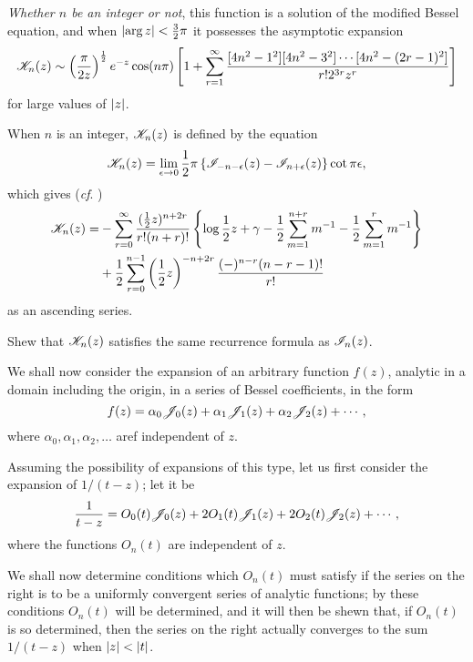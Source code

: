 % 
% 
\emph{Whether $n$ be an integer or not}, this function is a
solution of the modified Bessel equation, and when
$\left| \arg z \right| < \frac{3}{2} \pi$ it possesses the asymptotic
expansion
$$
\mathscr{K}_{n}(z)
\sim
\left(  \frac{\pi}{2z}  \right)^{\frac{1}{2}}
e^{-z}
\cos (n\pi)
\left[ 
  1
  +
  \sum_{r=1}^{\infty}
  \frac{ [4n^{2}-1^{2}] [4n^{2}-3^{2}] \cdots [4n^{2} - (2r-1)^{2}]}{r! 2^{3r} z^{r}}
 \right]
$$
for large values of $\left| z \right|$.

When $n$ is an integer, $\mathscr{K}_{n}(z)$ is defined by the equation
$$
\mathscr{K}_{n}(z)
=
\lim_{\epsilon\rightarrow 0}
\frac{1}{2} \pi
\left\{  \mathscr{I}_{-n-\epsilon}(z) - \mathscr{I}_{n+\epsilon}(z) \right\} \cot \pi\epsilon,
$$
which gives (\emph{cf}. )
\begin{align*}
  \mathscr{K}_{n}(z)
  =&
  -\sum_{r=0}^{\infty}
  \frac{(\frac{1}{2} z)^{n+2r}}{r! (n+r)!}
  \left\{ 
    \log \frac{1}{2} z + \gamma
    - \frac{1}{2} \sum_{m=1}^{n+r} m^{-1}
    - \frac{1}{2} \sum_{m=1}^{r} m^{-1}
   \right\}
  \\
  &
  + \frac{1}{2} \sum_{r=0}^{n-1}
  \left( \frac{1}{2} z \right)^{-n+2r}
  \frac{(-)^{n-r} (n-r-1)!}{r!}
\end{align*}
as an ascending series.
\begin{wandwexample}
  Shew that $\mathscr{K}_{n}(z)$ satisfies the same recurrence formula as
  $\mathscr{I}_{n}(z)$. 
\end{wandwexample}

We shall now consider the expansion of an arbitrary function
$f(z)$, analytic in a domain including the origin, in a series
of Bessel coefficients, in the form
$$
f(z) = \alpha_{0} \mathscr{J}_{0}(z) + \alpha_{1} \mathscr{J}_{1}(z) + \alpha_{2}
\mathscr{J}_{2}(z) + \cdots,
$$
where $\alpha_{0}, \alpha_{1}, \alpha_{2},\ldots$ aref independent of
$z$.

Assuming the possibility of expansions of this type, let us first
consider the expansion of $1/(t-z)$; let it be
$$
\frac{1}{t-z}
=
O_{0}(t) \mathscr{J}_{0}(z)
+ 2 O_{1}(t) \mathscr{J}_{1}(z)
+ 2 O_{2}(t) \mathscr{J}_{2}(z)
+ \cdots,
$$
where the functions $O_{n}(t)$ are independent of $z$.

We shall now determine conditions which $O_{n}(t)$ must satisfy if the
series on the right is to be a uniformly convergent series of analytic
functions; by these conditions $O_{n}(t)$ will be determined, and it
will then be shewn that, if $O_{n}(t)$ is so determined, then the series
on the right actually converges to the sum $1/(t-z)$ when
$\left| z \right| < \left| t \right|$.


